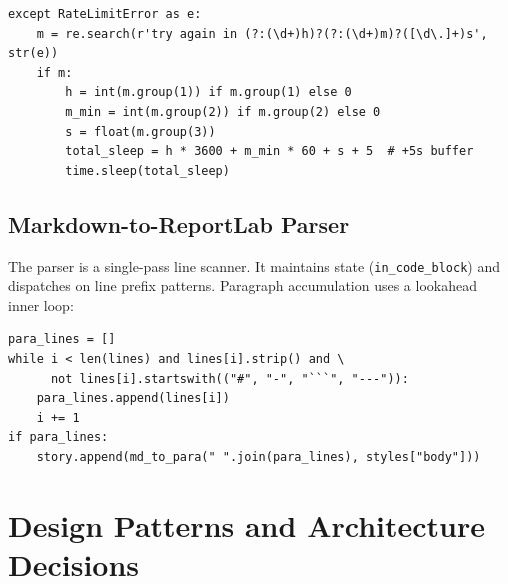 \documentclass[11pt,a4paper]{article}
\begin{document}
\begin{lstlisting}[caption={Smart rate-limit handler for Groq free tier}]
except RateLimitError as e:
    m = re.search(r'try again in (?:(\d+)h)?(?:(\d+)m)?([\d\.]+)s', str(e))
    if m:
        h = int(m.group(1)) if m.group(1) else 0
        m_min = int(m.group(2)) if m.group(2) else 0
        s = float(m.group(3))
        total_sleep = h * 3600 + m_min * 60 + s + 5  # +5s buffer
        time.sleep(total_sleep)
\end{lstlisting}

\subsection{Markdown-to-ReportLab Parser}

The parser is a single-pass line scanner. It maintains state (\texttt{in\_code\_block}) and dispatches on line prefix patterns. Paragraph accumulation uses a lookahead inner loop:
\begin{lstlisting}[caption={Paragraph accumulation loop}]
para_lines = []
while i < len(lines) and lines[i].strip() and \
      not lines[i].startswith(("#", "-", "```", "---")):
    para_lines.append(lines[i])
    i += 1
if para_lines:
    story.append(md_to_para(" ".join(para_lines), styles["body"]))
\end{lstlisting}

\section{Design Patterns and Architecture Decisions}
\end{document}
